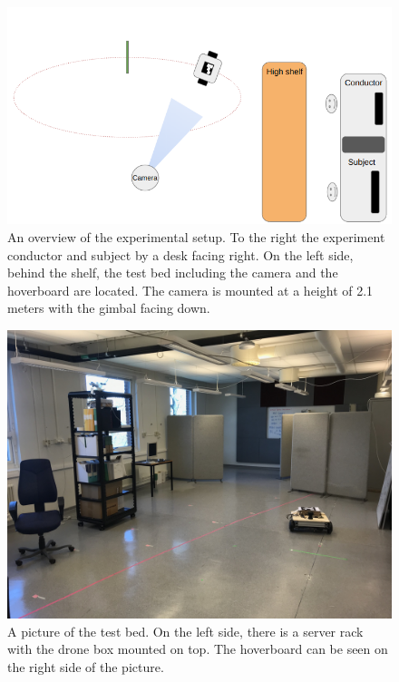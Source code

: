 \documentclass[nofilelist]{cslthse-msc}
\begin{document}
\begin{figure}[!hbt]
   \centering
   \includegraphics[scale=0.45]{images/exp-setup.png} 
   \caption{An overview of the experimental setup. To the right the experiment conductor and subject by a desk facing right. On the left side, behind the shelf, the test bed including the camera and the hoverboard are located. The camera is mounted at a height of 2.1 meters with the gimbal facing down.}
   \label{fig:exp-setup}
\end{figure}


\begin{figure}[!hbt]
   \centering
   \includegraphics[scale=0.1]{images/testbed.jpg} 
   \caption{A picture of the test bed. On the left side, there is a server rack with the drone box mounted on top. The hoverboard can be seen on the right side of the picture.}
   \label{fig:real-exp}
\end{figure}
\end{document}
